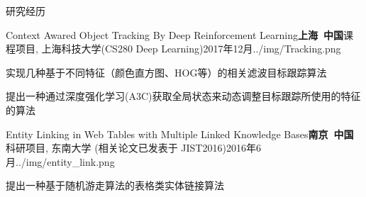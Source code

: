 \documentclass{resume_ch} %
\begin{document}
\begin{rSection}{研究经历}
\begin{rSubsection}{Context Awared Object Tracking By Deep Reinforcement Learning}{\bf 上海\ 中国}{课程项目, 上海科技大学(CS280 Deep Learning)}{2017年12月}{../img/Tracking.png}
    \item 实现几种基于不同特征（颜色直方图、HOG等）的相关滤波目标跟踪算法
    \item 提出一种通过深度强化学习(A3C)获取全局状态来动态调整目标跟踪所使用的特征的算法
\end{rSubsection}

\begin{rSubsection}{Entity Linking in Web Tables with Multiple Linked Knowledge Bases}{\bf 南京\ 中国}{科研项目, 东南大学 (相关论文已发表于 JIST2016)}{2016年6月}{../img/entity_link.png}
    \item 提出一种基于随机游走算法的表格类实体链接算法
\end{rSubsection}
        
\end{rSection} 
\end{document}
